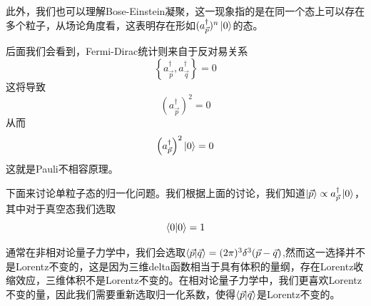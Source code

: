 此外，我们也可以理解Bose-Einstein凝聚，这一现象指的是在同一个态上可以存在多个粒子，从场论角度看，这表明存在形如$(a^{\dagger}_{\vec{p}})^{n}\ket{0}$的态。

后面我们会看到，Fermi-Dirac统计则来自于反对易关系
\begin{equation}
\label{fermi1}
    \left\{a^{\dagger}_{\vec{p}},a^{\dagger}_{\vec{q}}\right\}=0
\end{equation}
这将导致
\begin{equation}
    \left(a^{\dagger}_{\vec{p}}\right)^{2}=0
\end{equation}
从而
\begin{equation}
    \left(a^{\dagger}_{\vec{p}}\right)^{2}\ket{0}=0
\end{equation}
这就是Pauli不相容原理。

下面来讨论单粒子态的归一化问题。我们根据上面的讨论，我们知道$\ket{\vec{p}}\propto a^{\dagger}_{\vec{p}}\ket{0}$，其中对于真空态我们选取
\begin{equation}
    \braket{0}{0}=1
\end{equation}

通常在非相对论量子力学中，我们会选取$\braket{\vec{p}}{\vec{q}}=(2\pi)^{3}\delta^{3}(\vec{p}-\vec{q})$,然而这一选择并不是Lorentz不变的，这是因为三维delta函数相当于具有体积的量纲，存在Lorentz收缩效应，三维体积不是Lorentz不变的。在相对论量子力学中，我们更喜欢Lorentz不变的量，因此我们需要重新选取归一化系数，使得$\braket{\vec{p}}{\vec{q}}$是Lorentz不变的。

